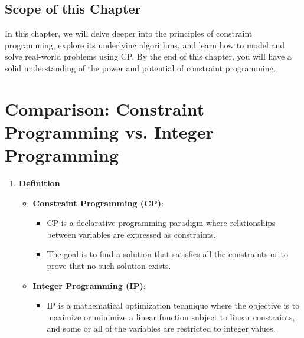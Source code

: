 \subsection{Scope of this Chapter}

In this chapter, we will delve deeper into the principles of constraint programming, explore its underlying algorithms, and learn how to model and solve real-world problems using CP. By the end of this chapter, you will have a solid understanding of the power and potential of constraint programming.


\section{Comparison: Constraint Programming vs. Integer Programming}

\begin{enumerate}[label=\textbf{\arabic*.}]
    \item \textbf{Definition}:
    \begin{itemize}
        \item \textbf{Constraint Programming (CP)}:
        \begin{itemize}
            \item CP is a declarative programming paradigm where relationships between variables are expressed as constraints.
            \item The goal is to find a solution that satisfies all the constraints or to prove that no such solution exists.
        \end{itemize}
        \item \textbf{Integer Programming (IP)}:
        \begin{itemize}
            \item IP is a mathematical optimization technique where the objective is to maximize or minimize a linear function subject to linear constraints, and some or all of the variables are restricted to integer values.
        \end{itemize}
    \end{itemize}
    

\end{enumerate}
